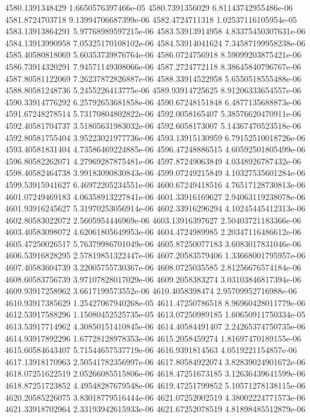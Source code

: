 {4580.1391348429 1.6650576397466e-05
4580.7391356029 6.81143742955486e-06
4581.8724703718 9.13994706687399e-06
4582.4724711318 1.02537116105954e-05
4583.13913864291 5.97768989597215e-06
4583.53913914958 4.83375450307631e-06
4584.13913990958 7.05325170108102e-06
4584.53914041624 7.34587199958238e-06
4585.40580818069 5.60353739876764e-06
4586.0724756918 8.59099203875421e-06
4586.73914320291 7.94571149308066e-06
4587.2724772118 8.38645840796767e-06
4587.80581122069 7.26237872826887e-06
4588.33914522958 5.6550518555488e-06
4588.80581248736 5.2455226413775e-06
4589.93914725625 8.91206333654557e-06
4590.33914776292 6.25792653681858e-06
4590.67248151848 6.4877135688873e-06
4591.67248278514 5.73170804802822e-06
4592.0058165407 5.38576620470911e-06
4592.40581704737 3.51805631983032e-06
4592.6058173007 5.14367470523518e-06
4592.80581755404 3.95223021977736e-06
4593.13915130959 6.79152510018726e-06
4593.40581831404 4.73586469224885e-06
4596.47248886515 4.60592501805499e-06
4596.80582262071 4.27969287875481e-06
4597.87249063849 4.0348926787432e-06
4598.40582464738 3.99183090830843e-06
4599.07249215849 4.10327535601284e-06
4599.53915941627 6.46972205234551e-06
4600.67249418516 4.76517128730813e-06
4601.07249469183 4.06358913227841e-06
4601.33916169627 2.94063119238078e-06
4601.93916245627 5.31970253056914e-06
4602.33916296294 4.10245445412313e-06
4602.80583022072 2.5605954446969e-06
4603.13916397627 2.50403721183366e-06
4603.40583098072 4.62061805649953e-06
4604.4724989985 2.20347116486612e-06
4605.47250026517 5.76379986701049e-06
4605.87250077183 3.6083017831046e-06
4606.53916828295 2.57819851322447e-06
4607.20583579406 1.33668001795957e-06
4607.40583604739 3.22005755730367e-06
4608.0725035585 2.81256676574184e-06
4608.60583756739 3.97107828017029e-06
4609.2058383274 3.03103846817394e-06
4609.93917258962 3.6617199573552e-06
4610.4058398474 2.95709952716988e-06
4610.93917385629 1.25427067940268e-05
4611.47250786518 8.96960428011779e-06
4612.53917588296 1.15080452525735e-05
4613.07250989185 1.60650911750334e-05
4613.53917714962 4.30850151410845e-06
4614.40584491407 2.24265374750735e-06
4614.93917892296 1.67728128978353e-06
4615.2058459274 1.81697470189155e-06
4615.60584643407 5.71544657537719e-06
4616.9391814563 4.0519221154857e-06
4617.13918170963 2.50541782356997e-06
4617.80584922074 3.82839024901672e-06
4618.07251622519 2.05266085515806e-06
4618.47251673185 3.12636439641599e-06
4618.87251723852 4.49548287679548e-06
4619.47251799852 5.10571278138115e-06
4620.20585226075 3.83018779516444e-06
4621.07252002519 4.38002224771573e-06
4621.33918702964 2.33193942615933e-06
4621.67252078519 4.81898485512879e-06
}
